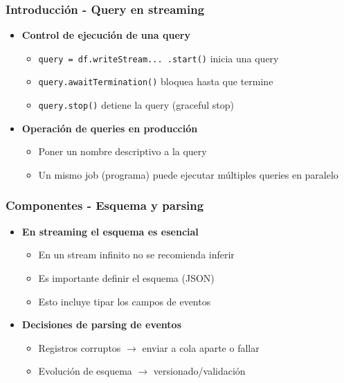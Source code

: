 \documentclass[aspectratio=169]{beamer}
\begin{document}
\begin{frame}\frametitle{Introducción - Query en streaming}
	\begin{itemize}
		\item \textbf{Control de ejecución de una query}
		\begin{itemize}
			\item \texttt{query = df.writeStream...\ .start()} inicia una query
			\item \texttt{query.awaitTermination()} bloquea hasta que termine
			\item \texttt{query.stop()} detiene la query (graceful stop)
		\end{itemize}
		\vspace{1em}
		\item \textbf{Operación de queries en producción}
		\begin{itemize}
			\item Poner un nombre descriptivo a la query
			\item Un mismo job (programa) puede ejecutar múltiples queries en paralelo
		\end{itemize}
	\end{itemize}
\end{frame}

\begin{frame}\frametitle{Componentes - Esquema y parsing}
	\begin{itemize}
		\item \textbf{En streaming el esquema es esencial}
		\begin{itemize}
			\item En un stream infinito no se recomienda inferir
			\item Es importante definir el esquema (JSON)
			\item Esto incluye tipar los campos de eventos
		\end{itemize}

		\vspace{1em}

		\item \textbf{Decisiones de parsing de eventos}
		\begin{itemize}
			\item Registros corruptos $\rightarrow$ enviar a cola aparte o fallar
			\item Evolución de esquema $\rightarrow$ versionado/validación
		\end{itemize}
	\end{itemize}
\end{frame}
\end{document}
